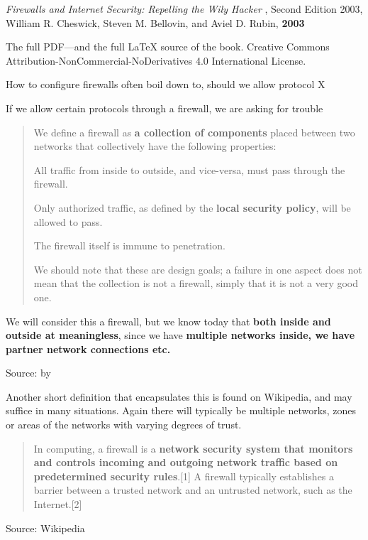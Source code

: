 \documentclass[Screen16to9,17pt]{foils}
\begin{document}
\begin{list2}
\item \emph{Firewalls and Internet Security: Repelling the Wily Hacker} , Second Edition 2003, William R. Cheswick, Steven M. Bellovin, and Aviel D. Rubin, {\bf 2003} 
\item The full PDF—and the full LaTeX source of the book.
Creative Commons Attribution-NonCommercial-NoDerivatives 4.0 International License.
\item How to configure firewalls often boil down to, should we allow protocol X
\item If we allow certain protocols through a firewall, we are asking for trouble
\end{list2}




\begin{quote}
We define a firewall as {\bf a collection of components} placed between two networks that collectively have
the following properties:
\begin{list2}
\item All traffic from inside to outside, and vice-versa, must pass through the firewall.
\item Only authorized traffic, as defined by the {\bf local security policy}, will be allowed to pass.
\item The firewall itself is immune to penetration.
\end{list2}
We should note that these are design goals; a failure in one aspect does not mean that the collection
is not a firewall, simply that it is not a very good one.
\end{quote}

We will consider this a firewall, but we know today that {\bf both inside and outside at meaningless}, since we have {\bf multiple networks inside, we have partner network connections etc.}

Source:  by \citeauthor{Cheswick94} \citeyear{Cheswick94}


Another short definition that encapsulates this is found on Wikipedia, and may suffice in many situations. Again there will typically be multiple networks, zones or areas of the networks with varying degrees of trust.
\begin{quote}
In computing, a firewall is a {\bf network security system that monitors and controls incoming and outgoing network traffic based on predetermined security rules}.[1] A firewall typically establishes a barrier between a trusted network and an untrusted network, such as the Internet.[2]
\end{quote}
Source: Wikipedia
\end{document}
